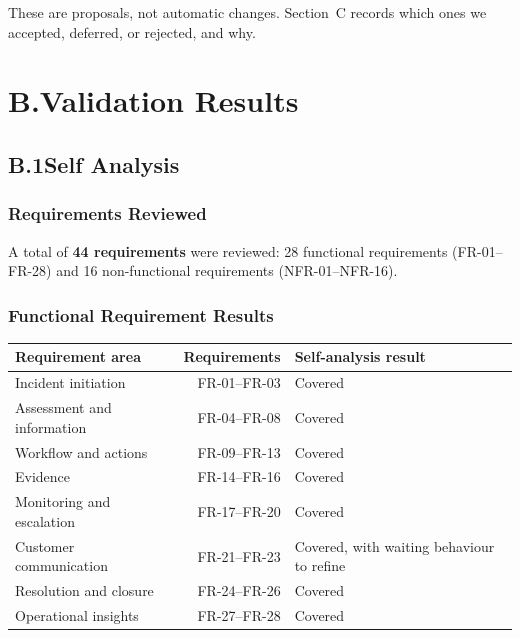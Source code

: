 \documentclass[11pt,a4paper]{article}
\begin{document}
These are proposals, not automatic changes. Section~C records which ones we accepted, deferred, or rejected, and why.

\section*{B.\enspace Validation Results}

\subsection*{B.1\enspace Self Analysis}

\subsubsection*{Requirements Reviewed}

A total of \textbf{44 requirements} were reviewed: 28 functional requirements (FR-01–FR-28) and 16 non-functional requirements (NFR-01–NFR-16).

\subsubsection*{Functional Requirement Results}

\begin{center}
\small
\begin{tabularx}{\textwidth}{@{} l r X @{}}
\toprule
\textbf{Requirement area} & \textbf{Requirements} & \textbf{Self-analysis result} \\
\midrule
Incident initiation        & FR-01–FR-03 & Covered \\
Assessment and information & FR-04–FR-08 & Covered \\
Workflow and actions       & FR-09–FR-13 & Covered \\
Evidence                   & FR-14–FR-16 & Covered \\
Monitoring and escalation  & FR-17–FR-20 & Covered \\
Customer communication     & FR-21–FR-23 & Covered, with waiting behaviour to refine \\
Resolution and closure     & FR-24–FR-26 & Covered \\
Operational insights       & FR-27–FR-28 & Covered \\
\bottomrule
\end{tabularx}
\end{center}
\end{document}
